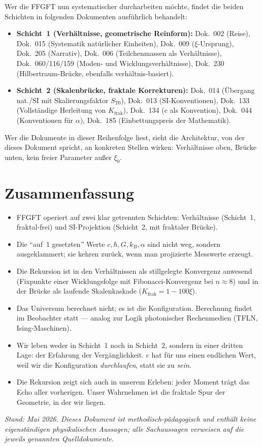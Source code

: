 Wer die FFGFT nun systematischer durcharbeiten möchte, findet die
beiden Schichten in folgenden Dokumenten ausführlich behandelt:

\begin{itemize}\setlength\itemsep{0pt}
  \item \textbf{Schicht~1 (Verhältnisse, geometrische Reinform):}
    Dok.~002 (Reise), Dok.~015 (Systematik natürlicher Einheiten),
    Dok.~009 ($\xi$-Ursprung), Dok.~205 (Narrativ),
    Dok.~006 (Teilchenmassen als Verhältnisse),
    Dok.~060/116/159 (Moden- und Wicklungsverhältnisse),
    Dok.~230 (Hilbertraum-Brücke, ebenfalls verhältnis-basiert).
  \item \textbf{Schicht~2 (Skalenbrücke, fraktale Korrekturen):}
    Dok.~014 (Übergang nat./SI mit Skalierungsfaktor $S_{T0}$),
    Dok.~013 (SI-Konventionen), Dok.~133 (Vollständige Herleitung von
    $K_{\mathrm{frak}}$), Dok.~134 (c als Konvention), Dok.~044
    (Konventionen für $\alpha$),
    Dok.~185 (Einbettungspreis der Mathematik).
\end{itemize}

Wer die Dokumente in dieser Reihenfolge liest, sieht die Architektur, von
der dieses Dokument spricht, an konkreten Stellen wirken: Verhältnisse
oben, Brücke unten, kein freier Parameter außer $\xi_{0}$.

\section*{Zusammenfassung}

\begin{itemize}\setlength\itemsep{2pt}
  \item FFGFT operiert auf zwei klar getrennten Schichten:
        Verhältnisse (Schicht~1, fraktal-frei) und SI-Projektion
        (Schicht~2, mit fraktaler Brücke).
  \item Die ``auf~1 gesetzten'' Werte $c, \hbar, G, k_B, \alpha$ sind
        nicht weg, sondern ausgeklammert; sie kehren zurück, wenn man
        projizierte Messwerte erzeugt.
  \item Die Rekursion ist in den Verhältnissen als stillgelegte
        Konvergenz anwesend (Fixpunkte einer Wicklungsfolge mit
        Fibonacci-Konvergenz bei $n \approx 8$) und in der Brücke als
        laufende Skalenkaskade ($K_{\mathrm{frak}} = 1 - 100\xi$).
  \item Das Universum berechnet nicht; es ist die Konfiguration.
        Berechnung findet im Beobachter statt --- analog zur Logik
        photonischer Rechenmedien (TFLN, Ising-Maschinen).
  \item Wir leben weder in Schicht~1 noch in Schicht~2, sondern in
        einer dritten Lage: der Erfahrung der Vergänglichkeit. $c$ hat
        für uns einen endlichen Wert, weil wir die Konfiguration
        \emph{durchlaufen}, statt sie zu \emph{sein}.
  \item Die Rekursion zeigt sich auch in unserem Erleben: jeder Moment
        trägt das Echo aller vorherigen. Unser Wahrnehmen ist die
        fraktale Spur der Geometrie, in der wir liegen.
\end{itemize}

\medskip
\noindent\textit{Stand: Mai 2026. Dieses Dokument ist
methodisch-pädagogisch und enthält keine eigenständigen physikalischen
Aussagen; alle Sachaussagen verweisen auf die jeweils genannten
Quelldokumente.}

